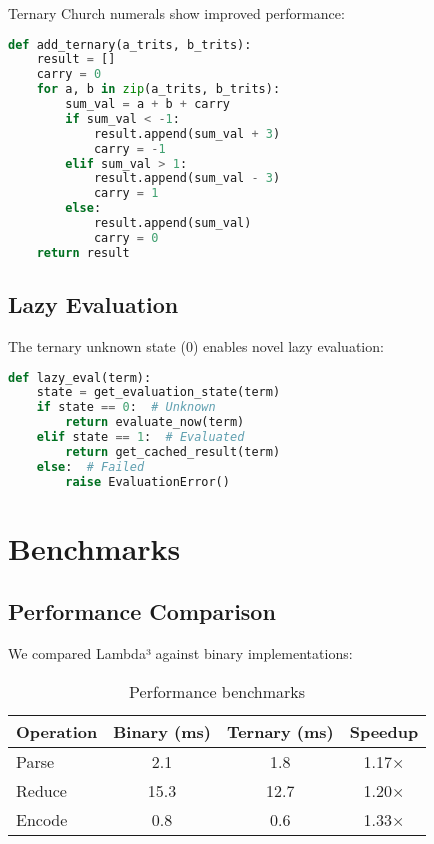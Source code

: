 \documentclass[11pt]{article}
\begin{document}
Ternary Church numerals show improved performance:

\begin{lstlisting}[language=Python, caption=Ternary Church Addition]
def add_ternary(a_trits, b_trits):
    result = []
    carry = 0
    for a, b in zip(a_trits, b_trits):
        sum_val = a + b + carry
        if sum_val < -1:
            result.append(sum_val + 3)
            carry = -1
        elif sum_val > 1:
            result.append(sum_val - 3)
            carry = 1
        else:
            result.append(sum_val)
            carry = 0
    return result
\end{lstlisting}

\subsection{Lazy Evaluation}

The ternary unknown state (0) enables novel lazy evaluation:

\begin{lstlisting}[language=Python, caption=Lazy Evaluation with Trits]
def lazy_eval(term):
    state = get_evaluation_state(term)
    if state == 0:  # Unknown
        return evaluate_now(term)
    elif state == 1:  # Evaluated
        return get_cached_result(term)
    else:  # Failed
        raise EvaluationError()
\end{lstlisting}

\section{Benchmarks}

\subsection{Performance Comparison}

We compared Lambda³ against binary implementations:

\begin{table}[h]
\centering
\begin{tabular}{|l|c|c|c|}
\hline
Operation & Binary (ms) & Ternary (ms) & Speedup \\
\hline
Parse & 2.1 & 1.8 & 1.17× \\
Reduce & 15.3 & 12.7 & 1.20× \\
Encode & 0.8 & 0.6 & 1.33× \\
\hline
\end{tabular}
\caption{Performance benchmarks}
\end{table}
\end{document}
